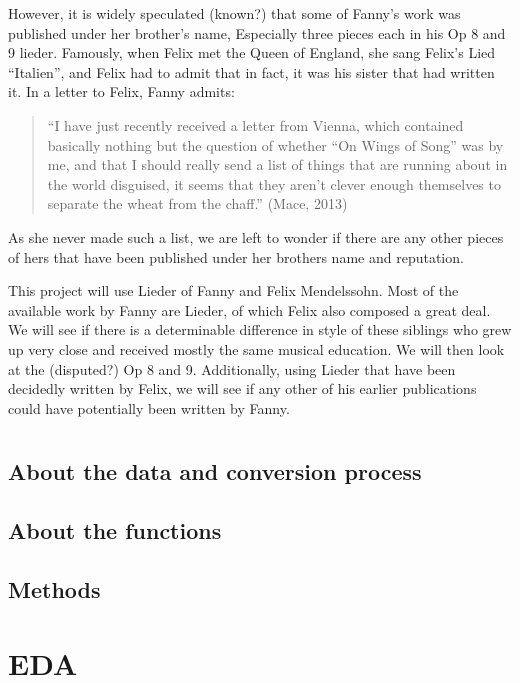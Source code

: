 \documentclass[12pt,twoside]{reedthesis}
\theoremstyle{definition}
\theoremstyle{definition}
\theoremstyle{definition}
\theoremstyle{remark}
\begin{document}
However, it is widely speculated (known?) that some of Fanny's work was
published under her brother's name, Especially three pieces each in his
Op 8 and 9 lieder. Famously, when Felix met the Queen of England, she
sang Felix's Lied ``Italien'', and Felix had to admit that in fact, it
was his sister that had written it. In a letter to Felix, Fanny admits:
\begin{quote}
``I have just recently received a letter from Vienna, which contained
basically nothing but the question of whether ``On Wings of Song'' was
by me, and that I should really send a list of things that are running
about in the world disguised, it seems that they aren't clever enough
themselves to separate the wheat from the chaff.'' (Mace, 2013)
\end{quote}
As she never made such a list, we are left to wonder if there are any
other pieces of hers that have been published under her brothers name
and reputation.

This project will use Lieder of Fanny and Felix Mendelssohn. Most of the
available work by Fanny are Lieder, of which Felix also composed a great
deal. We will see if there is a determinable difference in style of
these siblings who grew up very close and received mostly the same
musical education. We will then look at the (disputed?) Op 8 and 9.
Additionally, using Lieder that have been decidedly written by Felix, we
will see if any other of his earlier publications could have potentially
been written by Fanny.

\chapter{}\label{section-1}

\section{About the data and conversion
process}\label{about-the-data-and-conversion-process}

\section{About the functions}\label{about-the-functions}

\section{Methods}\label{methods}

\chapter{EDA}\label{eda}
\end{document}
